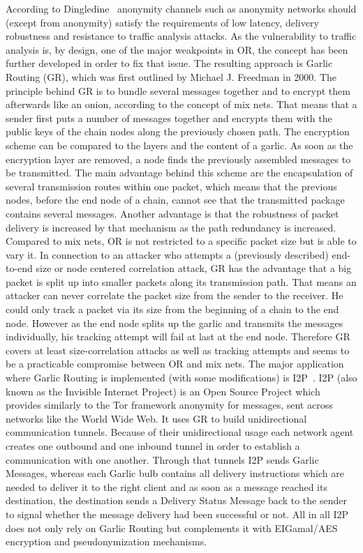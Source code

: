 \documentclass{sig-alternate}
\begin{document}
According to Dingledine~\cite{dingledine2000free} anonymity channels such as anonymity networks should (except from anonymity) satisfy the requirements of low latency, delivery robustness and resistance to traffic analysis attacks. As the vulnerability to traffic analysis is, by design, one of the major weakpoints in OR, the concept has been further developed in order to fix that issue. The resulting approach is Garlic Routing (GR), which was first outlined by Michael J. Freedman in 2000. The principle behind GR is to bundle several messages together and to encrypt them afterwards like an onion, according to the concept of mix nets. That means that a sender first puts a number of messages together and encrypts them with the public keys of the chain nodes along the previously chosen path. The encryption scheme can be compared to the layers and the content of a garlic. As soon as the encryption layer are removed, a node finds the previously assembled messages to be transmitted. The main advantage behind this scheme are the encapsulation of several transmission routes within one packet, which means that the previous nodes, before the end node of a chain, cannot see that the transmitted package contains several messages. Another advantage is that the robustness of packet delivery is increased by that mechanism as the path redundancy is increased. Compared to mix nets, OR is not restricted to a specific packet size but is able to vary it. In connection to an attacker who attempts a (previously described) end-to-end size or node centered correlation attack, GR has the advantage that a big packet is split up into smaller packets along its transmission path. That means an attacker can never correlate the packet size from the sender to the receiver. He could only track a packet via its size from the beginning of a chain to the end node. However as the end node splits up the garlic and transmits the messages individually, his tracking attempt will fail at last at the end node. Therefore GR covers at least size-correlation attacks as well as tracking attempts and seems to be a practicable compromise between OR and mix nets. The major application where Garlic Routing is implemented (with some modifications) is I2P~\cite{i2p}. I2P (also known as the Invisible Internet Project) is an Open Source Project which provides similarly to the Tor framework anonymity for messages, sent across networks like the World Wide Web. It uses GR to build unidirectional communication tunnels. Because of their unidirectional usage each network agent creates one outbound and one inbound tunnel in order to establish a communication with one another. Through that tunnels I2P sends Garlic Messages, whereas each Garlic bulb contains all delivery instructions which are needed to deliver it to the right client and as soon as a message reached its destination, the destination sends a Delivery Status Message back to the sender to signal whether the message delivery had been successful or not. All in all I2P does not only rely on Garlic Routing but complements it with EIGamal/AES encryption and pseudonymization mechanisms. 
\end{document}
